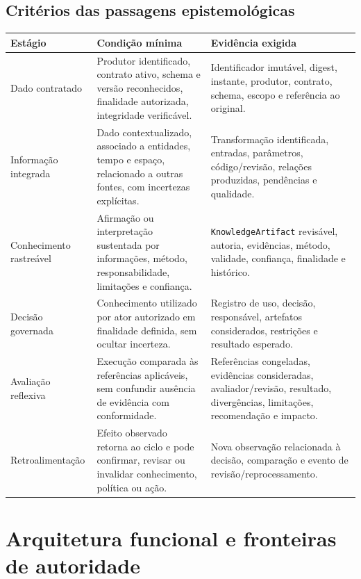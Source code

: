 \documentclass[11pt,a4paper,oneside]{article}
\begin{document}
\subsection{Critérios das passagens epistemológicas}
\begin{longtable}{P{3.0cm}P{5.4cm}P{6.4cm}}
\toprule
\textbf{Estágio} & \textbf{Condição mínima} & \textbf{Evidência exigida} \\
\midrule
\endhead
Dado contratado & Produtor identificado, contrato ativo, schema e versão reconhecidos, finalidade autorizada, integridade verificável. & Identificador imutável, digest, instante, produtor, contrato, schema, escopo e referência ao original. \\
Informação integrada & Dado contextualizado, associado a entidades, tempo e espaço, relacionado a outras fontes, com incertezas explícitas. & Transformação identificada, entradas, parâmetros, código/revisão, relações produzidas, pendências e qualidade. \\
Conhecimento rastreável & Afirmação ou interpretação sustentada por informações, método, responsabilidade, limitações e confiança. & \texttt{KnowledgeArtifact} revisável, autoria, evidências, método, validade, confiança, finalidade e histórico. \\
Decisão governada & Conhecimento utilizado por ator autorizado em finalidade definida, sem ocultar incerteza. & Registro de uso, decisão, responsável, artefatos considerados, restrições e resultado esperado. \\
Avaliação reflexiva & Execução comparada às referências aplicáveis, sem confundir ausência de evidência com conformidade. & Referências congeladas, evidências consideradas, avaliador/revisão, resultado, divergências, limitações, recomendação e impacto. \\
Retroalimentação & Efeito observado retorna ao ciclo e pode confirmar, revisar ou invalidar conhecimento, política ou ação. & Nova observação relacionada à decisão, comparação e evento de revisão/reprocessamento. \\
\bottomrule
\end{longtable}

\section{Arquitetura funcional e fronteiras de autoridade}
\end{document}
